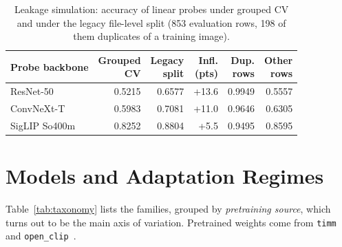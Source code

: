 \documentclass[conference]{IEEEtran}
\begin{document}
\begin{table}[t]
\centering\footnotesize
\caption{Leakage simulation: accuracy of linear probes under grouped CV and under the legacy file-level split (853
evaluation rows, 198 of them duplicates of a training image).}
\label{tab:leak}
\begin{tabular}{@{}lrrrrr@{}}
\toprule
Probe backbone & \shortstack{Grouped\\CV} & \shortstack{Legacy\\split} & \shortstack{Infl.\\(pts)} &
\shortstack{Dup.\\rows} & \shortstack{Other\\rows} \\
\midrule
ResNet-50 & 0.5215 & 0.6577 & +13.6 & 0.9949 & 0.5557 \\
ConvNeXt-T & 0.5983 & 0.7081 & +11.0 & 0.9646 & 0.6305 \\
SigLIP So400m & 0.8252 & 0.8804 & +5.5 & 0.9495 & 0.8595 \\
\bottomrule
\end{tabular}
\end{table}

\section{Models and Adaptation Regimes}\label{sec:models}
Table~\ref{tab:taxonomy} lists the families, grouped by \emph{pretraining source}, which turns out to be the main axis
of variation. Pretrained weights come from \texttt{timm}~\cite{wightman2021rsb} and
\texttt{open\_clip}~\cite{cherti2023openclip}.
\end{document}
